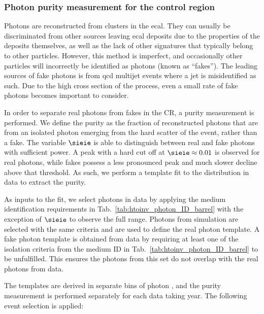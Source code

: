 



\subsubsection{Photon purity measurement for the \texorpdfstring{\singlePhotonCr}{photon} control region}
\label{subsubsec:htoinv_photon_purity}

Photons are reconstructed from clusters in the \acrshort{ecal}. They can usually be discriminated from other sources leaving \acrshort{ecal} deposits due to the properties of the deposits themselves, as well as the lack of other signatures that typically belong to other particles. However, this method is imperfect, and occasionally other particles will incorrectly be identified as photons (known as ``fakes''). The leading sources of fake photons is from \acrshort{qcd} multijet events where a \gls{jet} is misidentified as such. Due to the high cross section of the process, even a small rate of fake photons becomes important to consider.

In order to separate real photons from fakes in the \singlePhotonCr \gls{CR}, a purity measurement is performed. We define the purity as the fraction of reconstructed photons that are from an isolated photon emerging from the hard scatter of the event, rather than a fake. The variable $\sieie$ is able to distinguish between real and fake photons with sufficient power. A peak with a hard cut off at $\sieie \approx \text{0.01}$ is observed for real photons, while fakes possess a less pronounced peak and much slower decline above that threshold. As such, we perform a template fit to the distribution in data to extract the purity.

As inputs to the fit, we select photons in data by applying the medium identification requirements in Tab.~\ref{tab:htoinv_photon_ID_barrel} with the exception of $\sieie$ to observe the full range. Photons from \singlePhotonCr simulation are selected with the same criteria and are used to define the real photon template. A fake photon template is obtained from data by requiring at least one of the isolation criteria from the medium ID in Tab.~\ref{tab:htoinv_photon_ID_barrel} to be unfulfilled. This ensures the photons from this set do not overlap with the real photons from data.

The templates are derived in separate bins of photon \pt, and the purity measurement is performed separately for each data taking year. The following event selection is applied:

